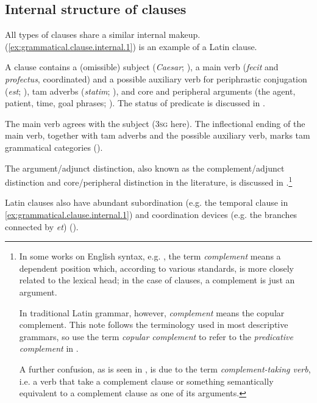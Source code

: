 \documentclass[a4paper, oneside, 12pt]{report}
\newcommand*{\term}[1]{\emph{#1}}
\newcommand{\form}[1]{\emph{#1}}
\newcommand*{\category}[1]{\textsc{#1}}
\begin{document}
\subsection{Internal structure of clauses}\label{sec:grammatical.clause.overview.internal}

All types of clauses share a similar internal makeup.
(\ref{ex:grammatical.clause.internal.1}) is an example of a Latin clause.

A clause contains a (omissible) subject
(\form{Caesar}; ),
a main verb (\form{fecit} and \form{profectus}, coordinated) and a possible auxiliary verb for periphrastic conjugation (\form{est}; ),
\ac{tam} adverbs (\form{statim}; ), and core and peripheral arguments (the agent, patient, time, goal phrases; ).
The status of predicate is discussed in .

The main verb agrees with the subject (\category{3sg} here).
The inflectional ending of the main verb, 
together with \ac{tam} adverbs and the possible auxiliary verb,
marks \ac{tam} grammatical categories ().


The argument/adjunct distinction, also known as the complement/adjunct distinction and core/peripheral distinction in the literature, 
is discussed in .\footnote{
    In some works on English syntax, e.g. \citet{cgel}, the term \term{complement} means a 
    dependent position which, according to various standards,
    is more closely related to the lexical head;
    in the case of clauses, a complement is just an argument.

    In traditional Latin grammar, however, \term{complement} means the copular complement. 
    This note follows the terminology used in most descriptive grammars,
    so use the term \term{copular complement} to refer to the \term{predicative complement} in \citet{cgel}.
    
    A further confusion, as is seen in , 
    is due to the term \term{complement-taking verb}, 
    i.e. a verb that take a complement clause 
    or something semantically equivalent to a complement clause
    as one of its arguments.
}

Latin clauses also have abundant subordination (e.g. the temporal clause in \ref{ex:grammatical.clause.internal.1}) and coordination devices (e.g. the branches connected by \form{et}) ().
\end{document}
